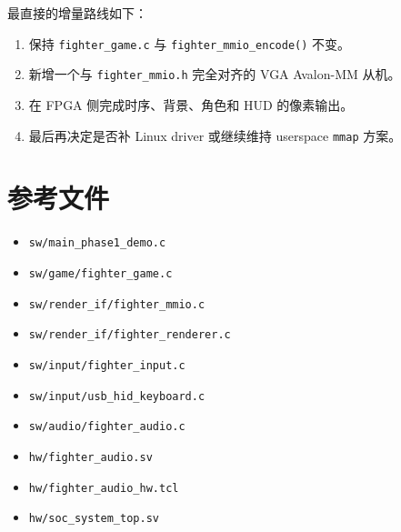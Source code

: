 \documentclass[12pt,a4paper]{ctexart}
\begin{document}
最直接的增量路线如下：

\begin{enumerate}
  \item 保持 \texttt{fighter\_game.c} 与 \texttt{fighter\_mmio\_encode()} 不变。
  \item 新增一个与 \texttt{fighter\_mmio.h} 完全对齐的 VGA Avalon-MM 从机。
  \item 在 FPGA 侧完成时序、背景、角色和 HUD 的像素输出。
  \item 最后再决定是否补 Linux driver 或继续维持 userspace \texttt{mmap} 方案。
\end{enumerate}

\section{参考文件}

\begin{itemize}
  \item \texttt{sw/main\_phase1\_demo.c}
  \item \texttt{sw/game/fighter\_game.c}
  \item \texttt{sw/render\_if/fighter\_mmio.c}
  \item \texttt{sw/render\_if/fighter\_renderer.c}
  \item \texttt{sw/input/fighter\_input.c}
  \item \texttt{sw/input/usb\_hid\_keyboard.c}
  \item \texttt{sw/audio/fighter\_audio.c}
  \item \texttt{hw/fighter\_audio.sv}
  \item \texttt{hw/fighter\_audio\_hw.tcl}
  \item \texttt{hw/soc\_system\_top.sv}
\end{itemize}
\end{document}

